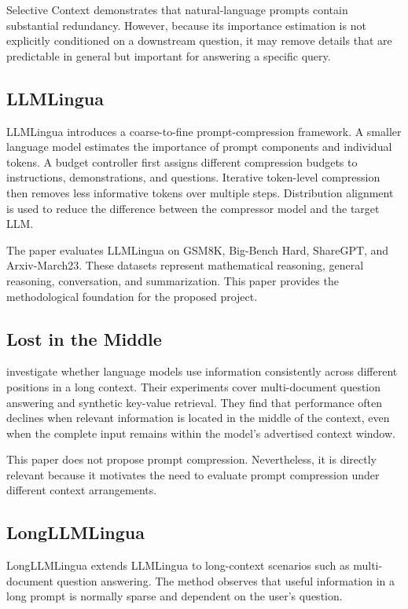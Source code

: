 \documentclass[10pt,a4paper,twocolumn]{article}
\begin{document}
Selective Context demonstrates that natural-language prompts contain substantial redundancy. However, because its importance estimation is not explicitly conditioned on a downstream question, it may remove details that are predictable in general but important for answering a specific query.

\subsection{LLMLingua}

LLMLingua \citep{jiang-etal-2023-llmlingua} introduces a coarse-to-fine prompt-compression framework. A smaller language model estimates the importance of prompt components and individual tokens. A budget controller first assigns different compression budgets to instructions, demonstrations, and questions. Iterative token-level compression then removes less informative tokens over multiple steps. Distribution alignment is used to reduce the difference between the compressor model and the target LLM.

The paper evaluates LLMLingua on GSM8K, Big-Bench Hard, ShareGPT, and Arxiv-March23. These datasets represent mathematical reasoning, general reasoning, conversation, and summarization. This paper provides the methodological foundation for the proposed project.

\subsection{Lost in the Middle}

\citet{liu-etal-2024-lost} investigate whether language models use information consistently across different positions in a long context. Their experiments cover multi-document question answering and synthetic key-value retrieval. They find that performance often declines when relevant information is located in the middle of the context, even when the complete input remains within the model's advertised context window.

This paper does not propose prompt compression. Nevertheless, it is directly relevant because it motivates the need to evaluate prompt compression under different context arrangements.

\subsection{LongLLMLingua}

LongLLMLingua \citep{jiang-etal-2024-longllmlingua} extends LLMLingua to long-context scenarios such as multi-document question answering. The method observes that useful information in a long prompt is normally sparse and dependent on the user's question.
\end{document}
